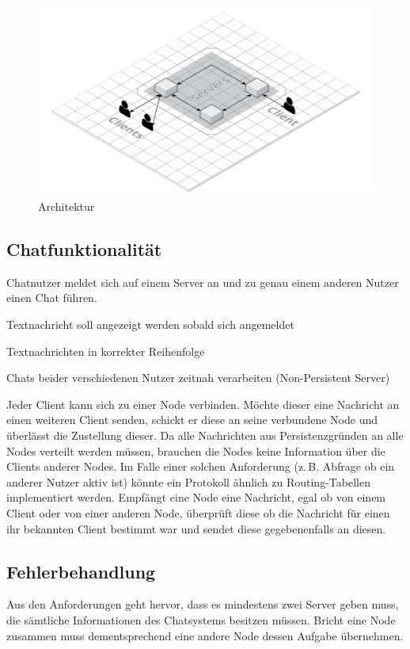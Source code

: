 



\begin{figure}[h]
    \centering
    \includegraphics[width=\textwidth]{architecture.png}
    
    \caption{Architektur}
    \label{}
\end{figure}

\subsection{Chatfunktionalität}

Chatnutzer meldet sich auf einem Server an und zu genau einem anderen Nutzer einen Chat führen.

Textnachricht soll angezeigt werden sobald sich angemeldet

Textnachrichten in korrekter Reihenfolge

Chats beider verschiedenen Nutzer zeitnah verarbeiten (Non-Persistent Server)

Jeder Client kann sich zu einer Node verbinden. Möchte dieser eine Nachricht an einen weiteren Client senden, schickt er diese an seine verbundene Node und überlässt die Zustellung dieser. Da alle Nachrichten aus Persistenzgründen an alle Nodes verteilt werden müssen, brauchen die Nodes keine Information über die Clients anderer Nodes. Im Falle einer solchen Anforderung (z.\,B. Abfrage ob ein anderer Nutzer aktiv ist) könnte ein Protokoll ähnlich zu Routing-Tabellen implementiert werden. Empfängt eine Node eine Nachricht, egal ob von einem Client oder von einer anderen Node, überprüft diese ob die Nachricht für einen ihr bekannten Client bestimmt war und sendet diese gegebenenfalls an diesen.

\subsection{Fehlerbehandlung}
Aus den Anforderungen geht hervor, dass es mindestens zwei Server geben muss, die sämtliche Informationen des Chatsystems besitzen müssen. Bricht eine Node zusammen muss dementsprechend eine andere Node dessen Aufgabe übernehmen.
